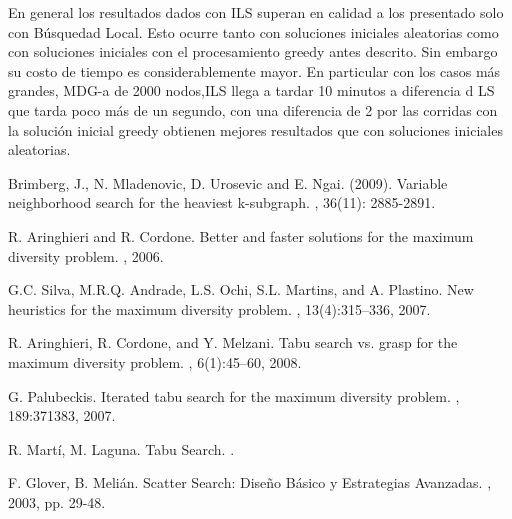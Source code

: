 \documentclass{ci5652}
\begin{document}
En general los resultados dados con ILS superan en calidad a los presentado solo con Búsquedad Local.
Esto ocurre tanto con soluciones iniciales aleatorias como con soluciones iniciales con el procesamiento
greedy antes descrito. Sin embargo su costo de tiempo es considerablemente mayor. En particular con los casos
más grandes, MDG-a de 2000 nodos,ILS llega a tardar 10 minutos a diferencia d LS que tarda poco más de un segundo,
con una diferencia de 2%
por las corridas con la solución inicial greedy obtienen mejores resultados que con soluciones iniciales
aleatorias.



\small


\begin{thebibliography}{99}

Brimberg, J., N. Mladenovic, D. Urosevic and E. Ngai. (2009).
\newblock Variable neighborhood search for the heaviest k-subgraph.
, 36(11): 2885-2891.

R. Aringhieri and R. Cordone.
\newblock Better and faster solutions for the maximum diversity problem.
, 2006.

G.C. Silva, M.R.Q. Andrade, L.S. Ochi, S.L. Martins, and A. Plastino.
\newblock New heuristics for the maximum diversity problem.
, 13(4):315–336, 2007.

R. Aringhieri, R. Cordone, and Y. Melzani.
\newblock Tabu search vs. grasp for the maximum diversity problem.
, 6(1):45–60, 2008.

G. Palubeckis.
\newblock Iterated tabu search for the maximum diversity problem.
, 189:371383, 2007.

R. Martí, M. Laguna.
\newblock Tabu Search.
.

F. Glover, B. Melián.
\newblock Scatter Search: Diseño Básico y Estrategias Avanzadas.
, 2003, pp. 29-48.


\end{thebibliography}
\end{document}
